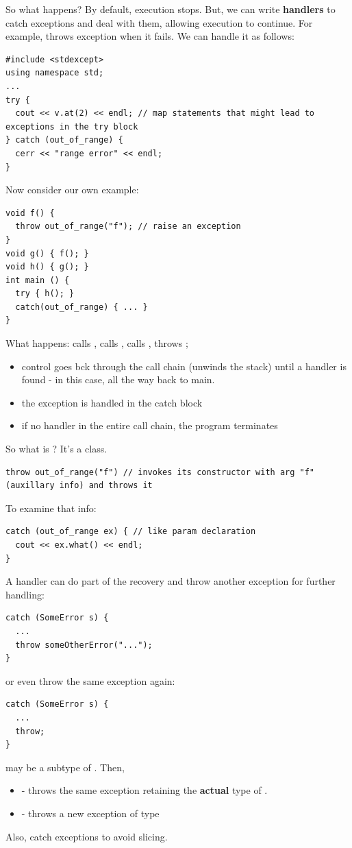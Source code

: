 \documentclass[english, 11pt]{article}
\begin{document}
So what happens? By default, execution stops. But, we can write \textbf{handlers} to catch exceptions and deal with them, allowing execution to continue. For example,  throws exception  when it fails. We can handle it as follows:
\begin{lstlisting}
#include <stdexcept>
using namespace std;
...
try {
  cout << v.at(2) << endl; // map statements that might lead to exceptions in the try block
} catch (out_of_range) {
  cerr << "range error" << endl;
}
\end{lstlisting}
Now consider our own example:
\begin{lstlisting}
void f() {
  throw out_of_range("f"); // raise an exception
}
void g() { f(); }
void h() { g(); }
int main () {
  try { h(); }
  catch(out_of_range) { ... }
}
\end{lstlisting}
What happens:  calls ,  calls ,  calls ,  throws ;
\begin{itemize}
  \item control goes bck through the call chain (unwinds the stack) until a handler is found - in this case, all the way back to main.
  \item the exception is handled in the catch block
  \item if no handler in the entire call chain, the program terminates
\end{itemize}
So what is ? It's a class.
\begin{lstlisting}
throw out_of_range("f") // invokes its constructor with arg "f" (auxillary info) and throws it
\end{lstlisting}
To examine that info:
\begin{lstlisting}
catch (out_of_range ex) { // like param declaration
  cout << ex.what() << endl;
}
\end{lstlisting}
A handler can do part of the recovery and throw another exception for further handling:
\begin{lstlisting}
catch (SomeError s) {
  ...
  throw someOtherError("...");
}
\end{lstlisting}
or even throw the same exception again:
\begin{lstlisting}
catch (SomeError s) {
  ...
  throw;
}
\end{lstlisting}
\begin{note}
   may be a subtype of . Then,
  \begin{itemize}
    \item {} - throws the same exception retaining the \textbf{actual} type of .
    \item {} - throws a new exception of type 
  \end{itemize}
\end{note}
Also, catch exceptions to avoid slicing. \\
\end{document}
